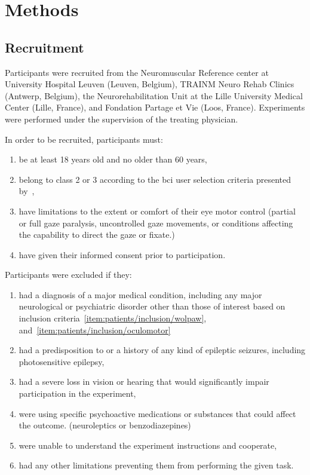 \documentclass{article}
\begin{document}
\section{Methods}
\subsection{Recruitment}
Participants were recruited from the Neuromuscular Reference center at
University Hospital Leuven (Leuven, Belgium), TRAINM Neuro Rehab Clinics
(Antwerp, Belgium), the Neurorehabilitation Unit at the Lille University
Medical Center (Lille, France), and Fondation Partage et Vie (Loos,
France).
Experiments were performed under the supervision of the treating physician.

In order to be recruited, participants must:
\begin{enumerate}
	\item be at least 18 years old and no older than 60
	      years,
	\item belong to class 2 or 3 according to the \ac{bci}	user selection criteria
	      presented by~\textcite{Wolpaw2006},%
	      \label{item:patients/inclusion/wolpaw}
	\item have limitations to the extent or comfort of their eye motor control
	      (partial or full gaze paralysis, uncontrolled gaze movements, or conditions affecting the capability to direct the gaze or fixate.)%
	      \label{item:patients/inclusion/oculomotor}
	\item have given their informed consent prior to participation.
\end{enumerate}
Participants were excluded if they:
\begin{enumerate}
	\item had a diagnosis of a major medical condition, including any major
	      neurological or psychiatric disorder other than those of interest based on
	      inclusion criteria~\ref{item:patients/inclusion/wolpaw},
	      and~\ref{item:patients/inclusion/oculomotor}\label{item:patients/exclusion/medical}
	\item had a predisposition to or a history of any kind of epileptic seizures,
	      including photosensitive epilepsy,\label{item:patients/exclusion/epilepsy}
	\item had a severe loss in vision or hearing that would significantly impair
	      participation in the experiment,\label{item:patients/exclusion/vision}
	\item were using specific psychoactive medications or substances that could affect the outcome.
	      (neuroleptics or benzodiazepines)%
	      \label{item:patients/exclusion/cognitive}
	\item were unable to understand the experiment instructions and cooperate,
	\item had any other limitations preventing them from performing the given task.
\end{enumerate}
\end{document}

